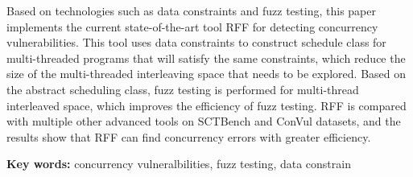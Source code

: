 
Based on technologies such as data constraints and fuzz testing, this paper implements the current state-of-the-art tool RFF for detecting concurrency vulnerabilities. This tool uses data constraints to construct schedule class for multi-threaded programs that will satisfy the same constraints, which reduce the size of the multi-threaded interleaving space that needs to be explored.
Based on the abstract scheduling class, fuzz testing is performed for multi-thread interleaved space, which improves the efficiency of fuzz testing. RFF is compared with multiple other advanced tools on SCTBench and ConVul datasets, and the results show that RFF can find concurrency errors with greater efficiency.

\textbf{Key words: } concurrency vulneralbilities, fuzz testing, data constrain